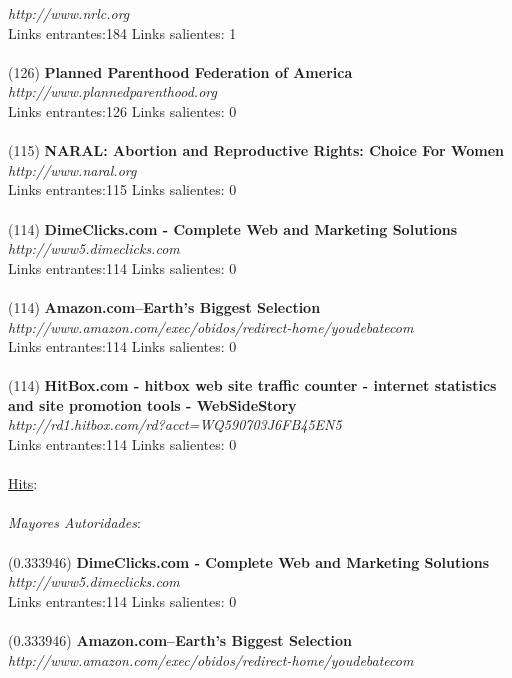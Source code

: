 \documentclass[a4paper]{article}
\begin{document}
\textit{http://www.nrlc.org} \\
Links entrantes:184 \indent Links salientes: 1\\
\\
(126) \textbf{Planned Parenthood Federation of America} \\
\textit{http://www.plannedparenthood.org} \\
Links entrantes:126 \indent Links salientes: 0\\
\\
(115) \textbf{NARAL: Abortion and Reproductive Rights: Choice For Women} \\
\textit{http://www.naral.org }\\
Links entrantes:115 \indent Links salientes: 0\\
\\
(114) \textbf{DimeClicks.com - Complete Web and Marketing Solutions} \\
\textit{http://www5.dimeclicks.com }\\
Links entrantes:114 \indent Links salientes: 0\\
\\
(114)\textbf{ Amazon.com--Earth's Biggest Selection }\\
\textit{http://www.amazon.com/exec/obidos/redirect-home/youdebatecom} \\
Links entrantes:114 \indent Links salientes: 0\\
\\
(114) \textbf{HitBox.com - hitbox web site traffic counter - internet statistics and site promotion tools - WebSideStory} \\
\textit{http://rd1.hitbox.com/rd?acct=WQ590703J6FB45EN5} \\
Links entrantes:114 \indent Links salientes: 0\\
\\
\underline{Hits}: \\
\\
\emph{Mayores Autoridades}: \\
\\
(0.333946) \textbf{DimeClicks.com - Complete Web and Marketing Solutions} \\
\textit{http://www5.dimeclicks.com }\\
Links entrantes:114 \indent Links salientes: 0\\
\\
(0.333946) \textbf{Amazon.com--Earth's Biggest Selection} \\
\textit{http://www.amazon.com/exec/obidos/redirect-home/youdebatecom} \\
\end{document}
